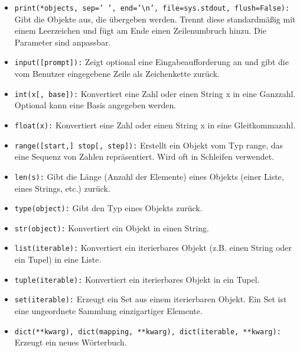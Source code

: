 \documentclass[11pt, oneside]{book}
\begin{document}
\begin{itemize}
    \item \texttt{print(*objects, sep=' ', end='\textbackslash{n}', file=sys.stdout, flush=False):} Gibt die Objekte aus, die übergeben werden. Trennt diese standardmäßig mit einem Leerzeichen und fügt am Ende einen Zeilenumbruch hinzu. Die Parameter sind anpassbar.
    
    \item \texttt{input([prompt]):} Zeigt optional eine Eingabeaufforderung an und gibt die vom Benutzer eingegebene Zeile als Zeichenkette zurück.

    \item \texttt{int(x[, base]):} Konvertiert eine Zahl oder einen String x in eine Ganzzahl. Optional kann eine Basis angegeben werden.

    \item \texttt{float(x):} Konvertiert eine Zahl oder einen String x in eine Gleitkommazahl.
    
    \item \texttt{range([start,] stop[, step]):} Erstellt ein Objekt vom Typ range, das eine Sequenz von Zahlen repräsentiert. Wird oft in Schleifen verwendet.
    
    \item \texttt{len(s):} Gibt die Länge (Anzahl der Elemente) eines Objekts (einer Liste, eines Strings, etc.) zurück.
    
    \item \texttt{type(object):} Gibt den Typ eines Objekts zurück.
    
    \item \texttt{str(object):} Konvertiert ein Objekt in einen String.
    
    \item \texttt{list(iterable):} Konvertiert ein iterierbares Objekt (z.B. einen String oder ein Tupel) in eine Liste.
    
    \item \texttt{tuple(iterable):} Konvertiert ein iterierbares Objekt in ein Tupel.
    
    \item \texttt{set(iterable):} Erzeugt ein Set aus einem iterierbaren Objekt. Ein Set ist eine ungeordnete Sammlung einzigartiger Elemente.
    
    \item \texttt{dict(**kwarg), dict(mapping, **kwarg), dict(iterable, **kwarg):} Erzeugt ein neues Wörterbuch.
    

\end{itemize}
\end{document}
